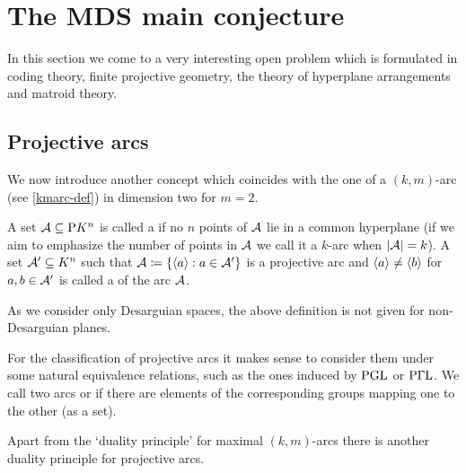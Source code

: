 \section{The MDS main conjecture}%
\makeatletter%
\def\@currentlabel{Section \thesection}%
\makeatother%
\label{sec-mds-connections}

In this section we come to a very interesting open problem which is formulated in coding theory, finite projective geometry, the theory of hyperplane arrangements and matroid theory.

\subsection{Projective arcs}

We now introduce another concept which coincides with the one of a $(k,m)$-arc (see \autoref{kmarc-def}) in dimension two for $m=2$.

\begin{definition}
    A set $\cA\setleq \P K^n$ is called a  if no $n$ points of $\mathcal{A}$ lie in a common hyperplane (if we aim to emphasize the number of points in $\mathcal{A}$ we call it a $k$-arc when $\left\vert{\mathcal{A}}\right\vert=k$).
    A set $\mathcal{A}'\subseteq K^n$ such that $\cA\defeq\set{\gen a}[a\in\cA']$ is a projective arc and $\gen a\neq\gen b$ for $a,b\in\mathcal{A}'$ is called a  of the arc $\mathcal{A}$.
\end{definition}

\begin{remark}
    As we consider only Desarguian spaces, the above definition is not given for non-Desarguian planes.
\end{remark}

For the classification of projective arcs it makes sense to consider them under some natural equivalence relations, such as the ones induced by $\mathrm{PGL}$ or $\mathrm{P\Gamma L}$. We call two arcs  or  if there are elements of the corresponding groups mapping one to the other (as a set). 

Apart from the `duality principle' for maximal $(k,m)$-arcs there is another duality principle for projective arcs.

